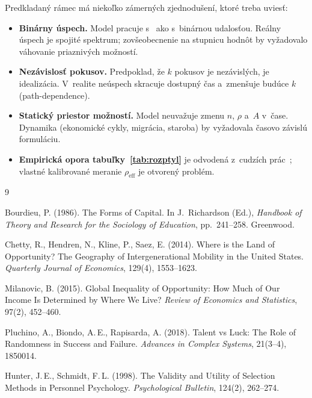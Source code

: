 \documentclass[12pt,a4paper]{article}
\begin{document}
Predkladaný rámec má niekoľko zámerných zjednodušení, ktoré treba uviesť:
\begin{itemize}
    \item \textbf{Binárny úspech.} Model pracuje s~ ako s~binárnou udalosťou. Reálny úspech je spojité spektrum; zovšeobecnenie na stupnicu hodnôt by vyžadovalo váhovanie priaznivých možností.
    \item \textbf{Nezávislosť pokusov.} Predpoklad, že $k$ pokusov je nezávislých, je idealizácia. V~realite neúspech skracuje dostupný čas a~zmenšuje budúce $k$ (path-dependence).
    \item \textbf{Statický priestor možností.} Model neuvažuje zmenu $n$, $\rho$ a~$A$ v~čase. Dynamika (ekonomické cykly, migrácia, staroba) by vyžadovala časovo závislú formuláciu.
    \item \textbf{Empirická opora tabuľky~\ref{tab:rozptyl}} je odvodená z~cudzích prác~\cite{milanovic2015,chetty2014,hunter1998,pluchino2018}; vlastné kalibrované meranie $\rho_{\text{eff}}$ je otvorený problém.
\end{itemize}

\begin{thebibliography}{9}

 Bourdieu, P. (1986). The Forms of Capital. In J.~Richardson (Ed.), \textit{Handbook of Theory and Research for the Sociology of Education}, pp.~241--258. Greenwood.

 Chetty, R., Hendren, N., Kline, P., Saez, E. (2014). Where is the Land of Opportunity? The Geography of Intergenerational Mobility in the United States. \textit{Quarterly Journal of Economics}, 129(4), 1553--1623.

 Milanovic, B. (2015). Global Inequality of Opportunity: How Much of Our Income Is Determined by Where We Live? \textit{Review of Economics and Statistics}, 97(2), 452--460.

 Pluchino, A., Biondo, A.\,E., Rapisarda, A. (2018). Talent vs Luck: The Role of Randomness in Success and Failure. \textit{Advances in Complex Systems}, 21(3--4), 1850014.

 Hunter, J.\,E., Schmidt, F.\,L. (1998). The Validity and Utility of Selection Methods in Personnel Psychology. \textit{Psychological Bulletin}, 124(2), 262--274.

\end{thebibliography}
\end{document}
